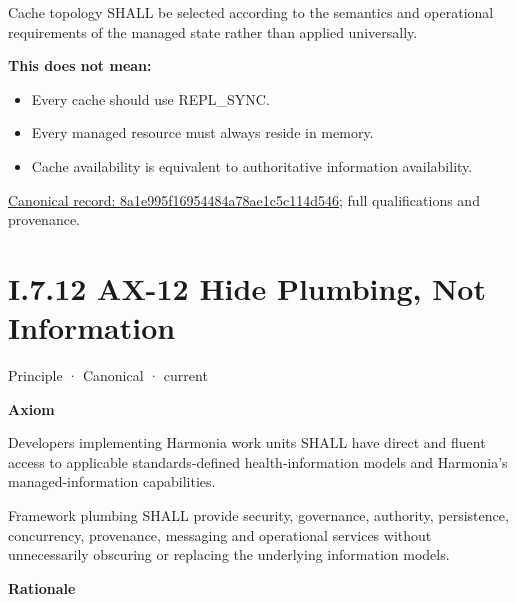 Cache topology SHALL be selected according to the semantics and
operational requirements of the managed state rather than applied
universally.



\textbf{This does not mean:}



\begin{itemize}


\item Every cache should use REPL\_SYNC.

\item Every managed resource must always reside in memory.

\item Cache availability is equivalent to authoritative information availability.

\end{itemize}

{\footnotesize \href{../../../../../../../continuum/motivation/principle/8a1e995f16954484a78ae1c5c114d546.md}{Canonical record: 8a1e995f16954484a78ae1c5c114d546}; full qualifications and provenance.}\par
\section*{I.7.12 AX-12 Hide Plumbing, Not Information}
\label{navigation:I.7.12}

\label{element:ce85889bd9b34f79a53d4c907ceb19d4}
{\small Principle · Canonical · current}\par

\par\medskip\textbf{Axiom}\par


Developers implementing Harmonia work units SHALL have direct and fluent
access to applicable standards-defined health-information models and
Harmonia's managed-information capabilities.



Framework plumbing SHALL provide security, governance, authority,
persistence, concurrency, provenance, messaging and operational services
without unnecessarily obscuring or replacing the underlying information
models.



\par\medskip\textbf{Rationale}\par


